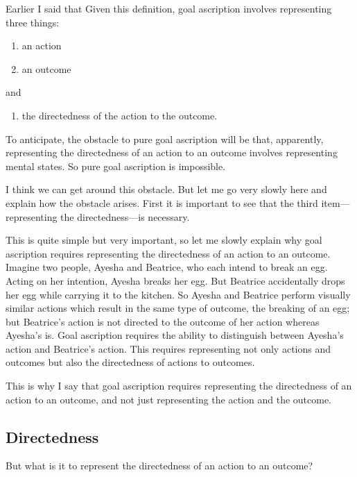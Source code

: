 \documentclass[12pt,\papersize]{extarticle}
\begin{document}
Earlier I said that \dfGoalAscription{}
Given this definition,
 goal ascription involves representing three things:
\begin{enumerate}
\item an action
\item an outcome
\end{enumerate}
and
\begin{enumerate}[resume]
\item the directedness of the action to the outcome.
\end{enumerate}
%
To anticipate, 
the obstacle to pure goal ascription will be that, apparently, representing the directedness of an action to an outcome involves representing mental states.
So pure goal ascription is impossible.

I think we can get around this obstacle.  
But let me go very slowly here and explain how the obstacle arises.
First it is important to see that the third item---representing the directedness---is necessary.

This is quite simple but very important, so let me slowly explain why goal ascription requires representing the directedness of an action to an outcome.
Imagine two people, Ayesha and Beatrice, who each intend to break an egg.
Acting on her intention, Ayesha breaks her egg.
But Beatrice accidentally drops her egg while carrying it to the kitchen.
So Ayesha and Beatrice perform visually similar actions which result in the same type of outcome, the breaking of an egg; 
	but Beatrice's action is not directed to the outcome of her action whereas Ayesha's is.
Goal ascription requires the ability to distinguish between Ayesha's action and Beatrice's action. 
This requires representing not only actions and outcomes but also the directedness of actions to outcomes.

This is why I say that goal ascription requires representing the directedness of an action to an outcome, and not just representing the action and the outcome.

\subsection{Directedness}
But what is it to represent the directedness of an action to an outcome?
\end{document}
